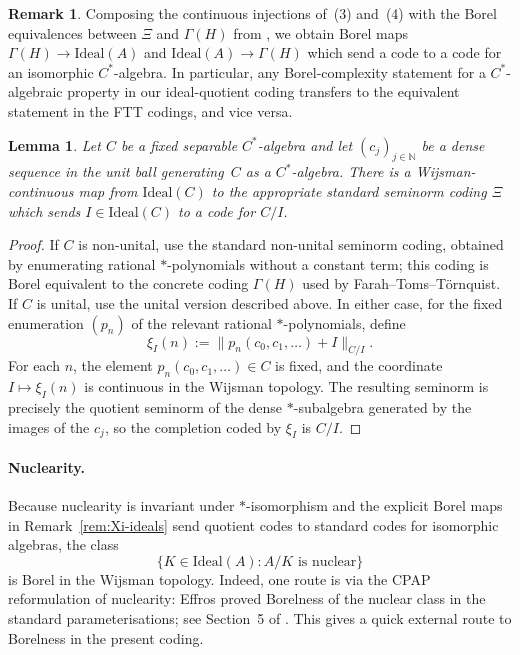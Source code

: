\documentclass[12pt,fleqn,a4paper]{amsart}
\numberwithin{equation}{section}
\newtheorem{lemma}[theorem]{Lemma}
\theoremstyle{definition}
\newtheorem{remark}[theorem]{Remark}
\newcommand{\N}{\mathbb{N}}
\newcommand{\Ideal}{\mathrm{Ideal}}
\begin{document}
\begin{remark}
\smallskip
{}
Composing the continuous injections of~(3) and~(4) with the Borel equivalences
between $\Xi$ and $\Gamma(H)$ from
\cite{FarahTomsTornquistCrelle}, we obtain Borel maps $\Gamma(H)\to\Ideal(A)$ and
$\Ideal(A)\to\Gamma(H)$ which send a code to a code for an isomorphic $C^*$-algebra.
In particular, any Borel-complexity statement for a $C^*$-algebraic property in our
ideal-quotient coding transfers to the equivalent statement in the FTT codings, and
vice versa.
\end{remark}

\begin{lemma}\label{lem:fixed-ideal-to-Xi}
Let $C$ be a fixed separable $C^*$-algebra and let $(c_j)_{j\in\N}$ be a dense
sequence in the unit ball generating~$C$ as a $C^*$-algebra.  There is a
Wijsman-continuous map from $\Ideal(C)$ to the appropriate standard seminorm coding
$\Xi$ which sends $I\in\Ideal(C)$ to a code for $C/I$.
\end{lemma}

\begin{proof}
If $C$ is non-unital, use the standard non-unital seminorm coding, obtained by
enumerating rational $*$-polynomials without a constant term; this coding is Borel
equivalent to the concrete coding $\Gamma(H)$ used by Farah--Toms--T\"ornquist.  If
$C$ is unital, use the unital version described above.  In either case, for the fixed
enumeration $(p_n)$ of the relevant rational $*$-polynomials, define
\[
        \xi_I(n):=\|p_n(c_0,c_1,\ldots)+I\|_{C/I}.
\]
For each $n$, the element $p_n(c_0,c_1,\ldots)\in C$ is fixed, and the coordinate
$I\mapsto\xi_I(n)$ is continuous in the Wijsman topology.  The resulting seminorm is
precisely the quotient seminorm of the dense $*$-subalgebra generated by the images of
the $c_j$, so the completion coded by $\xi_I$ is $C/I$.
\end{proof}

\paragraph{Nuclearity.}
Because nuclearity is invariant under $*$-isomorphism and the explicit Borel maps in
Remark~\ref{rem:Xi-ideals} send quotient codes to standard codes for isomorphic
algebras, the class
\[
\{K\in\Ideal(A):A/K\text{ is nuclear}\}
\]
is Borel in the Wijsman topology.  Indeed, one route is via the CPAP
reformulation of nuclearity: Effros proved Borelness of the nuclear class in the
standard parameterisations; see Section~5 of \cite{FarahTomsTornquistCrelle}.
This gives a quick external route to Borelness in the present coding.
\end{document}
